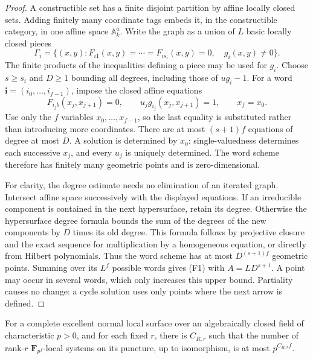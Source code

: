 \begin{proof}
A constructible set has a finite disjoint partition by affine
locally closed sets. Adding finitely many coordinate tags embeds
it, in the constructible category, in one affine space
\(\mathbb A^a_k\). Write the graph as a union of \(L\) basic locally
closed pieces
\[
 \Gamma_i=\{(x,y):
 F_{i1}(x,y)=\cdots=F_{is_i}(x,y)=0,\quad g_i(x,y)\ne0\}.
\]
The finite products of the inequalities defining a piece may be
used for \(g_i\). Choose \(s\geq s_i\) and \(D\geq1\) bounding all
degrees, including those of \(u g_i-1\).
For a word \(\boldsymbol i=(i_0,\ldots,i_{f-1})\), impose the
closed affine equations
\[
 F_{i_jb}(x_j,x_{j+1})=0,\qquad
 u_jg_{i_j}(x_j,x_{j+1})=1,\qquad x_f=x_0.
\]
Use only the \(f\) variables \(x_0,\ldots,x_{f-1}\), so the last
equality is substituted rather than introducing more coordinates.
There are at most \((s+1)f\) equations of degree at most \(D\).
A solution is determined by \(x_0\): single-valuedness determines
each successive \(x_j\), and every \(u_j\) is uniquely determined.
The word scheme therefore has finitely many geometric points and
is zero-dimensional.

For clarity, the degree estimate needs no elimination of an
iterated graph. Intersect affine space successively with the
displayed equations. If an irreducible component is contained
in the next hypersurface, retain its degree. Otherwise the
hypersurface degree formula bounds the sum of the degrees of the
new components by \(D\) times its old degree. This formula follows
by projective closure and the exact sequence for multiplication
by a homogeneous equation, or directly from Hilbert polynomials.
Thus the word scheme has at most \(D^{(s+1)f}\) geometric points.
Summing over its \(L^f\) possible words gives (F1) with
\(A=LD^{s+1}\). A point may occur in several words, which only
increases this upper bound. Partiality causes no change:
a cycle solution uses only points where the next arrow is defined.
\end{proof}

\begin{corollary}
\label{D:local-fixed-rank-representation-growth}
For a complete excellent normal local surface over an algebraically
closed field of characteristic \(p>0\), and for each fixed \(r\),
there is \(C_{R,r}\) such that the number of rank-\(r\)
\(\mathbf F_{p^f}\)-local systems on its puncture, up to isomorphism,
is at most \(p^{C_{R,r}f}\).
\end{corollary}

